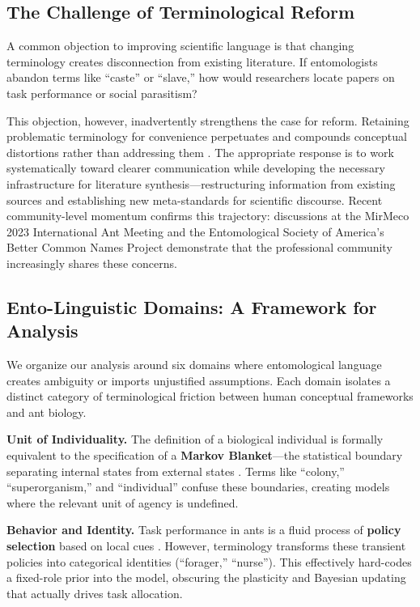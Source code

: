 \documentclass[
]{article}
\numberwithin{equation}{section}
\begin{document}
\subsection{The Challenge of Terminological
Reform}\label{the-challenge-of-terminological-reform}

A common objection to improving scientific language is that changing
terminology creates disconnection from existing literature. If
entomologists abandon terms like ``caste'' or ``slave,'' how would
researchers locate papers on task performance or social parasitism?

This objection, however, inadvertently strengthens the case for reform.
Retaining problematic terminology for convenience perpetuates and
compounds conceptual distortions rather than addressing them
\cite{herbers2006}. The appropriate response is to work systematically
toward clearer communication while developing the necessary
infrastructure for literature synthesis---restructuring information from
existing sources and establishing new meta-standards for scientific
discourse. Recent community-level momentum confirms this trajectory:
discussions at the MirMeco 2023 International Ant Meeting
\cite{laciny2024terminology} and the Entomological Society of America's
Better Common Names Project \cite{betternamesproject2024} demonstrate
that the professional community increasingly shares these concerns.

\subsection{Ento-Linguistic Domains: A Framework for
Analysis}\label{ento-linguistic-domains-a-framework-for-analysis}

We organize our analysis around six domains where entomological language
creates ambiguity or imports unjustified assumptions. Each domain
isolates a distinct category of terminological friction between human
conceptual frameworks and ant biology.

\textbf{Unit of Individuality.} The definition of a biological
individual is formally equivalent to the specification of a
\textbf{Markov Blanket}---the statistical boundary separating internal
states from external states \cite{friston2013life}. Terms like
``colony,'' ``superorganism,'' and ``individual'' confuse these
boundaries, creating models where the relevant unit of agency is
undefined.

\textbf{Behavior and Identity.} Task performance in ants is a fluid
process of \textbf{policy selection} based on local cues
\cite{gordon2010}. However, terminology transforms these transient
policies into categorical identities (``forager,'' ``nurse''). This
effectively hard-codes a fixed-role prior into the model, obscuring the
plasticity and Bayesian updating that actually drives task allocation.
\end{document}
